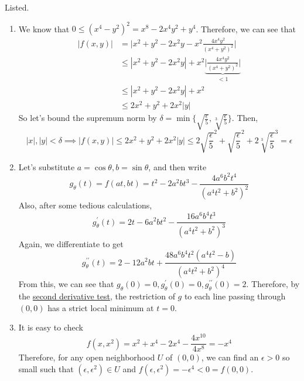 	\begin{solution}
	  Listed. 
		\begin{enumerate}
		  \item We know that $0 \leq (x^4 - y^2)^2 = x^8 - 2x^4 y^2 + y^4$. Therefore, we can see that 
				\begin{align}
					|f(x, y)| & = \bigg| x^2 + y^2 - 2x^2 y - x^2 \frac{4 x^4 y^2}{(x^4 + y^2)^2} \bigg| \\ 
										& \leq |x^2 + y^2 - 2 x^2 y| + x^2 \underbrace{\bigg| \frac{4x^4 y^2}{(x^4 + y^2)^2} \bigg|}_{< 1} \\ 
										& \leq |x^2 + y^2 - 2 x^2 y| + x^2 \\ 
										& \leq 2x^2 + y^2 + 2 x^2 |y|
				\end{align}
				So let's bound the supremum norm by $\delta = \min\{\sqrt{\frac{\epsilon}{5}}, \sqrt[3]{\frac{\epsilon}{5}}\}$. Then, 
				\begin{equation}
					|x|, |y| < \delta \implies |f(x, y)| \leq 2x^2 + y^2 + 2x^2 |y| \leq 2 \sqrt{\frac{\epsilon}{5}}^2 + \sqrt{\frac{\epsilon}{5}}^2 + 2 \sqrt[3]{\frac{\epsilon}{5}}^3 = \epsilon
				\end{equation}
			
			\item Let's substitute $a = \cos{\theta}, b = \sin{\theta}$, and then write 
				\begin{equation}
					g_\theta (t) = f(at, bt) = t^2 - 2 a^2 b t^3 - \frac{4 a^6 b^2 t^4}{(a^4 t^2 + b^2)^2}
				\end{equation}
				Also, after some tedious calculations, 
				\begin{equation}
					g_{\theta}^\prime (t) = 2t - 6a^2 b t^2 - \frac{16 a^6 b^4 t^3}{(a^4 t^2 + b^2)^3}
				\end{equation} 
				Again, we differentiate to get 
				\begin{equation}
					g_{\theta}^{\prime\prime} (t) = 2 - 12 a^2 b t + \frac{48a^6 b^4 t^2 (a^4 t^2 - b)}{(a^4 t^2 + b^2)^4}
				\end{equation}
				From this, we can see that $g_\theta (0) = 0, g_\theta^\prime (0) = 0, g_{\theta}^{\prime\prime} (0) = 2$. Therefore, by the \hyperref[real-thm:second-der-test]{second derivative test}, the restriction of $g$ to each line passing through $(0, 0)$ has a strict local minimum at $t = 0$. 

			\item It is easy to check 
				\begin{equation}
					f(x, x^2) = x^2 + x^4 - 2 x^4 - \frac{4x^10}{4x^8} = - x^4
				\end{equation} 
				Therefore, for any open neighborhood $U$ of $(0, 0)$, we can find an $\epsilon > 0$ so small such that $(\epsilon, \epsilon^2) \in U$ and $f(\epsilon, \epsilon^2) = -\epsilon^4 < 0 = f(0, 0)$. 
		\end{enumerate}
	\end{solution}


